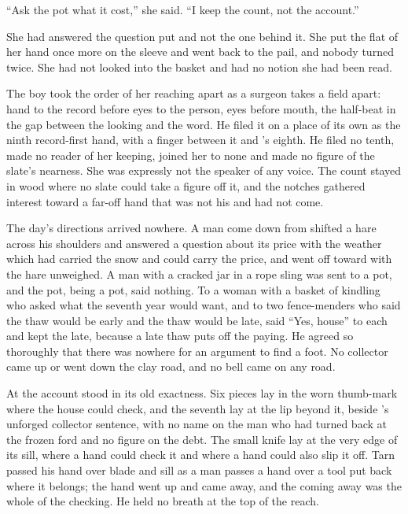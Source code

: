 “Ask the pot what it cost,” she said. “I keep the count, not the account.”

She had answered the question put and not the one behind it. She put the flat of her hand once more on the sleeve and went back to the pail, and nobody turned twice. She had not looked into the basket and had no notion she had been read.

The boy took the order of her reaching apart as a surgeon takes a field apart: hand to the record before eyes to the person, eyes before mouth, the half-beat in the gap between the looking and the word. He filed it on a place of its own as the ninth record-first hand, with a finger between it and 's eighth. He filed no tenth, made no reader of her keeping, joined her to none and made no figure of the slate's nearness. She was expressly not the speaker of any voice. The count stayed in wood where no slate could take a figure off it, and the notches gathered interest toward a far-off hand that was not his and had not come.

The day's directions arrived nowhere. A man come down from  shifted a hare across his shoulders and answered a question about its price with the weather which had carried the snow and could carry the price, and went off toward  with the hare unweighed. A man with a cracked jar in a rope sling was sent to a pot, and the pot, being a pot, said nothing. To a woman with a basket of kindling who asked what the seventh year would want, and to two fence-menders who said the thaw would be early and the thaw would be late,  said “Yes, house” to each and kept the late, because a late thaw puts off the paying. He agreed so thoroughly that there was nowhere for an argument to find a foot. No collector came up or went down the clay road, and no bell came on any road.

\scenebreak

At  the account stood in its old exactness. Six pieces lay in the worn thumb-mark where the house could check, and the seventh lay at the lip beyond it, beside 's unforged collector sentence, with no name on the man who had turned back at the frozen ford and no figure on the debt. The small knife lay at the very edge of its sill, where a hand could check it and where a hand could also slip it off. Tarn passed his hand over blade and sill as a man passes a hand over a tool put back where it belongs; the hand went up and came away, and the coming away was the whole of the checking. He held no breath at the top of the reach.

